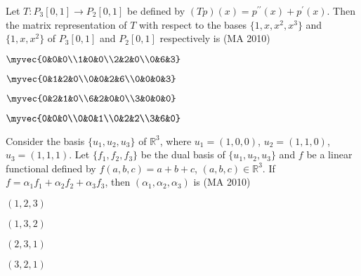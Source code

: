 \item Let $T:P_3[0,1]\to P_2[0,1]$ be defined by $(Tp)(x)=p^{\prime\prime}(x)+p^{\prime}(x)$. Then the matrix representation of $T$ with respect to the bases $\{1,x,x^2,x^3\}$ and $\{1,x,x^2\}$ of $P_3[0,1]$ and $P_2[0,1]$ respectively is \underline{\hspace{2cm}}
\hfill(MA 2010)
\begin{enumerate}
\begin{multicols}{4}
\item $\myvec{0&0&0\\1&0&0\\2&2&0\\0&6&3}$
\item $\myvec{0&1&2&0\\0&0&2&6\\0&0&0&3}$
\item $\myvec{0&2&1&0\\6&2&0&0\\3&0&0&0}$
\item $\myvec{0&0&0\\0&0&1\\0&2&2\\3&6&0}$
\end{multicols}
\end{enumerate}
\item Consider the basis $\{u_1,u_2,u_3\}$ of $\mathbb{R}^3$, where $u_1=(1,0,0)$, $u_2=(1,1,0)$, $u_3=(1,1,1)$. Let $\{f_1,f_2,f_3\}$ be the dual basis of $\{u_1,u_2,u_3\}$ and $f$ be a linear functional defined by $f(a,b,c)=a+b+c$, $(a,b,c)\in\mathbb{R}^3$. If $f=\alpha_1f_1+\alpha_2f_2+\alpha_3f_3$, then $(\alpha_1,\alpha_2,\alpha_3)$ is \underline{\hspace{2cm}}
\hfill(MA 2010)
\begin{enumerate}
\begin{multicols}{4}
\item $(1,2,3)$
\item $(1,3,2)$
\item $(2,3,1)$
\item $(3,2,1)$
\end{multicols}
\end{enumerate}


